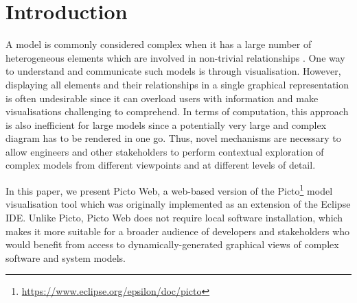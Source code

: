 \documentclass[sigconf,review]{acmart}
\begin{document}


\maketitle

\section{Introduction}
\label{sec:introduction}
A model is commonly considered complex when it has a large number of heterogeneous elements which are involved in non-trivial relationships \cite{boccara2010complex,klosterman2012complex}. One way to understand and communicate such models is through visualisation. However, displaying all elements and their relationships in a single graphical representation is often undesirable since it can overload users with information and make visualisations challenging to comprehend. In terms of computation, this approach is also inefficient for large models since a potentially very large and complex diagram has to be rendered in one go. Thus, novel mechanisms are necessary to allow engineers and other stakeholders to perform contextual exploration of complex models from different viewpoints and at different levels of detail. 

In this paper, we present Picto Web, a web-based version of the Picto\footnote{\url{https://www.eclipse.org/epsilon/doc/picto}} \cite{dimitris2020picto} model visualisation tool which was originally implemented as an extension of the Eclipse IDE. Unlike Picto, Picto Web does not require local software installation, which makes it more suitable for a broader audience of developers and stakeholders who would benefit from access to dynamically-generated graphical views of complex software and system models.
\end{document}

